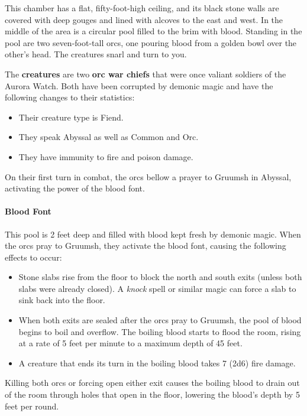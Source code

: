 \documentclass[a4paper, 11pt, bg=full, twocolumn, nooutline]{dndbook}
\begin{document}
\begin{DndReadAloud}
This chamber has a flat, fifty-foot-high ceiling, and its black stone walls are covered with deep gouges and lined with alcoves to the east and west. In the middle of the area is a circular pool filled to the brim with blood. Standing in the pool are two seven-foot-tall orcs, one pouring blood from a golden bowl over the other's head. The creatures snarl and turn to you.
\end{DndReadAloud}

The \textbf{creatures} are two \textbf{orc war chiefs} that were once valiant soldiers of the Aurora Watch. Both have been corrupted by demonic magic and have the following changes to their statistics:

\begin{itemize}
\item Their creature type is Fiend.
\item They speak Abyssal as well as Common and Orc.
\item They have immunity to fire and poison damage.
\end{itemize}

On their first turn in combat, the orcs bellow a prayer to Gruumsh in Abyssal, activating the power of the blood font.

\paragraph{Blood Font}

This pool is 2 feet deep and filled with blood kept fresh by demonic magic. When the orcs pray to Gruumsh, they activate the blood font, causing the following effects to occur:

\begin{itemize}
\item Stone slabs rise from the floor to block the north and south exits (unless both slabs were already closed). A \textit{knock} spell or similar magic can force a slab to sink back into the floor.
\item When both exits are sealed after the orcs pray to Gruumsh, the pool of blood begins to boil and overflow. The boiling blood starts to flood the room, rising at a rate of 5 feet per minute to a maximum depth of 45 feet.
\item A creature that ends its turn in the boiling blood takes 7 (2d6) fire damage.
\end{itemize}

Killing both orcs or forcing open either exit causes the boiling blood to drain out of the room through holes that open in the floor, lowering the blood's depth by 5 feet per round.
\end{document}
